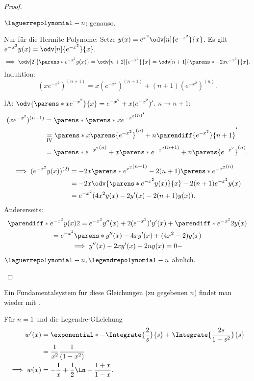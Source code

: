 \begin{proof}
\begin{proofdescription}
    \( \laguerrepolynomial-{n}{} \): genauso.
    \item[\ordinalnum{2} \Beh] Nur für die Hermite-Polynome: Setze \( y(x)=e^{x^2}\odv[n]{e^{-x^2}}{x} \). Es gilt \( e^{-x^2}y(x)=\odv[n]{e^{-x^2}}{x} \).
    \begin{equation*}
      \implies \odv[2]{\parens*{e^{-x^2}y(x)}}=\odv[n+2]{e^{-x^2}}{x}=\odv[n+1]{\parens*{-2xe^{-x^2}}}{x}.
    \end{equation*}
    Induktion:
    \begin{equation*}
      (xe^{-x^2})^{(n+1)}=x(e^{-x^2})^{(n+1)}+(n+1)(e^{-x^2})^{(n)}.
    \end{equation*}
    \begin{subproof}[]
      IA\@: \( \odv{\parens*{xe^{-x^2}}}{x}=e^{-x^2}+x(e^{-x^2})' \).
      \( n\to n+1 \):
      \begin{align*}
        (xe^{-x^2})^{(n+1)}&=\parens*{\parens*{xe^{-x^2}}^{(n)}}'\\
        &\underset{\text{IV}}{=}\parens*{x\parens{e^{-x^2}}^{(n)}+n\parendiff{e^{-x^2}}{n+1}}'\\
        &=\parens*{e^{-x^2}}^{(n)}+x\parens*{e^{-x^2}}^{(n+1)}+n\parens{e^{-x^2}}^{(n)}.
      \end{align*}
    \end{subproof}
    \begin{align*}
      \implies (e^{-x^2}y(x))^{(2)}&=-2x\parens*{e^{x^2}}^{(n+1)}-2(n+1)\parens*{e^{-x^2}}^{(n)}\\
      &=-2x\odv{\parens*{e^{-x^2}y(x)}}{x}-2(n+1)e^{-x^2}y(x)\\
      &=e^{-x^2}(4x^2y(x)-2y'(x)-2(n+1)y(x)).
    \end{align*}
    Andererseits:
    \begin{gather*}
      \parendiff*{e^{-x^2}y(x)}{2}=e^{-x^2}y''(x)+2(e^{-x^2})'y'(x)+\parendiff*{e^{-x^2}}{2}y(x)\\
      =e^{-x^2}\parens*{y''(x)-4xy'(x)+(4x^2-2)y(x)}\\
      \implies y''(x)-2xy'(x)+2ny(x)=0-
    \end{gather*}
    \( \laguerrepolynomial-{n}{},\legendrepolynomial-{n}{} \) ähnlich.
  \end{proofdescription}  
\end{proof}
Ein Fundamentalsystem für diese Gleichungen (zu gegebenen \( n \)) findet man \zb wieder mit .

\begin{beispiel*}
  Für \( n=1 \) und die Legendre-GLeichung
  \begin{align*}
    w'(x)&=\exponential*{-\Integrate{\frac{2}{s}}{s}+\Integrate{\frac{2s}{1-s^2}}{s}}\\
    &=\frac{1}{x^2}\frac{1}{(1-x^2)}\\
    \implies w(x)&=-\frac{1}{x}+\frac{1}{2}\Ln-{\frac{1+x}{1-x}}.
  \end{align*}
\end{beispiel*}